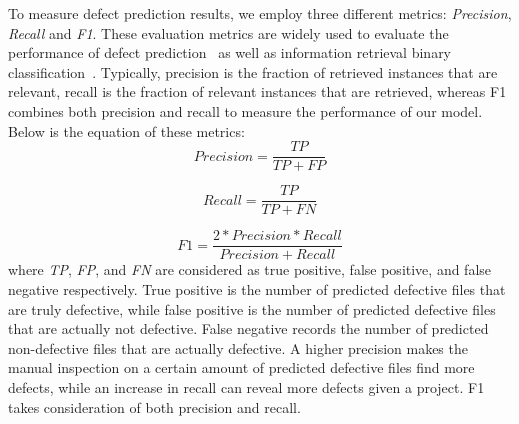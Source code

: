 To measure defect prediction results, we employ three different metrics: \textit{Precision}, \textit{Recall} and \textit{F1}. These evaluation metrics are widely used to evaluate the performance of defect prediction~\cite{menzies2007data, menzies2010defect, nam2013transfer} as well as information retrieval binary classification~\cite{manning2008introduction}. Typically, precision is the fraction of retrieved instances that are relevant, recall is the fraction of relevant instances that are retrieved, whereas F1 combines both precision and recall to measure the performance of our model. Below is the equation of these metrics:
\begin{equation}
\label{eq:precision}
Precision = \frac{TP}{TP+FP}
\end{equation}

\begin{equation}
\label{eq:recall}
Recall = \frac{TP}{TP+FN}
\end{equation}

\begin{equation}
\label{eq:f1}
F1 = \frac{2 * Precision * Recall}{Precision + Recall}
\end{equation}
where \textit{TP}, \textit{FP}, and \textit{FN} are considered as true positive, false positive, and false negative respectively. True positive is the number of predicted defective files that are truly defective, while false positive is the number of predicted defective files that are actually not defective. False negative records the number of predicted non-defective files that are actually defective. A higher precision makes the manual inspection on a certain amount of predicted defective files find more defects, while an increase in recall can reveal more defects given a project. F1 takes consideration of both precision and recall.
